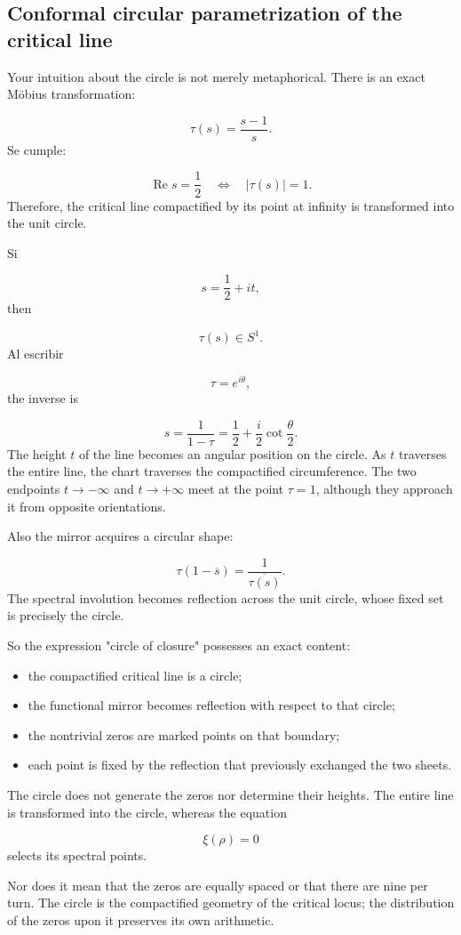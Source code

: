 \subsection{Conformal circular parametrization of the critical line}
Your intuition about the circle is not merely metaphorical. There is an exact Möbius transformation:\par
\[
\tau(s)
=
\frac{s-1}{s}.
\]
Se cumple:\par
\[
\operatorname{Re}s=\frac12
\quad\Longleftrightarrow\quad
|\tau(s)|=1.
\]
Therefore, the critical line compactified by its point at infinity is transformed into the unit circle.\par
Si\par
\[
s=\frac12+it,
\]
then\par
\[
\tau(s)\in S^1.
\]
Al escribir\par
\[
\tau=e^{i\theta},
\]
the inverse is\par
\[
s=\frac1{1-\tau}
=
\frac12+\frac{i}{2}\cot\frac{\theta}{2}.
\]
The height \(t\) of the line becomes an angular position on the circle. As \(t\) traverses the entire line, the chart traverses the compactified circumference. The two endpoints \(t\to-\infty\) and \(t\to+\infty\) meet at the point \(\tau=1\), although they approach it from opposite orientations.\par
Also the mirror acquires a circular shape:\par
\[
\tau(1-\overline s)
=
\frac1{\overline{\tau(s)}}.
\]
The spectral involution becomes reflection across the unit circle, whose fixed set is precisely the circle.\par
So the expression "circle of closure" possesses an exact content:\par
\begin{itemize}
\item the compactified critical line is a circle;
\item the functional mirror becomes reflection with respect to that
circle;
\item the nontrivial zeros are marked points on that boundary;
\item each point is fixed by the reflection that previously exchanged the two sheets.
\end{itemize}
The circle does not generate the zeros nor determine their heights. The entire line is transformed into the circle, whereas the equation\par
\[
\xi(\rho)=0
\]
selects its spectral points.\par
Nor does it mean that the zeros are equally spaced or that there are nine per turn. The circle is the compactified geometry of the critical locus; the distribution of the zeros upon it preserves its own arithmetic.\par
{}
